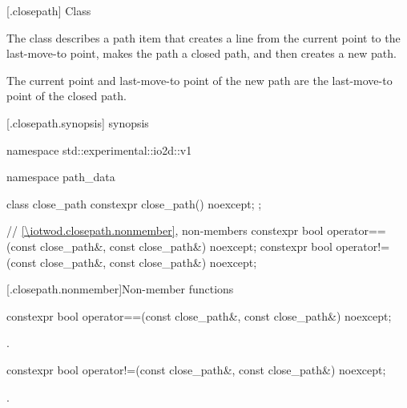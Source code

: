  [\iotwod.closepath] {Class }%

\pnum
{}
The class  describes a path item that creates a line from the current point to the last-move-to point, makes the path a closed path, and then creates a new path.

\pnum
The current point and last-move-to point of the new path are the last-move-to point of the closed path.

 [\iotwod.closepath.synopsis] { synopsis}%

\begin{codeblock}
namespace std::experimental::io2d::v1 {
  namespace path_data {
    class close_path {
      constexpr close_path() noexcept;
    };
    
    // \ref{\iotwod.closepath.nonmember}, non-members
    constexpr bool operator==(const close_path&, const close_path&) noexcept;
    constexpr bool operator!=(const close_path&, const close_path&) noexcept;
  }
}
\end{codeblock}

 [\iotwod.closepath.nonmember]{Non-member functions}%

%
\begin{itemdecl}
constexpr bool operator==(const close_path&, const close_path&) noexcept;
\end{itemdecl}
\begin{itemdescr}
\pnum
\returns
{}.
\end{itemdescr}

%
\begin{itemdecl}
constexpr bool operator!=(const close_path&, const close_path&) noexcept;
\end{itemdecl}
\begin{itemdescr}
\pnum
\returns
{}.
\end{itemdescr}
